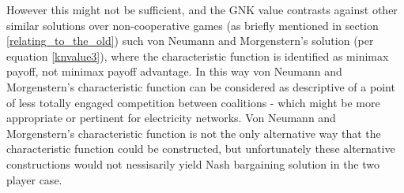However this might not be sufficient, and the GNK value contrasts against other similar solutions over non-cooperative games (as briefly mentioned in section \ref{relating_to_the_old}) such von Neumann and Morgenstern's solution (per equation \ref{knvalue3}), where the characteristic function is identified as minimax payoff, not minimax payoff advantage.
In this way von Neumann and Morgenstern's characteristic function can be considered as descriptive of a point of less totally engaged competition between coalitions - which might be more appropriate or pertinent for electricity networks.
Von Neumann and Morgenstern's characteristic function is not the only alternative way that the characteristic function could be constructed, but unfortunately these alternative constructions would not nessisarily yield Nash bargaining solution in the two player case.







